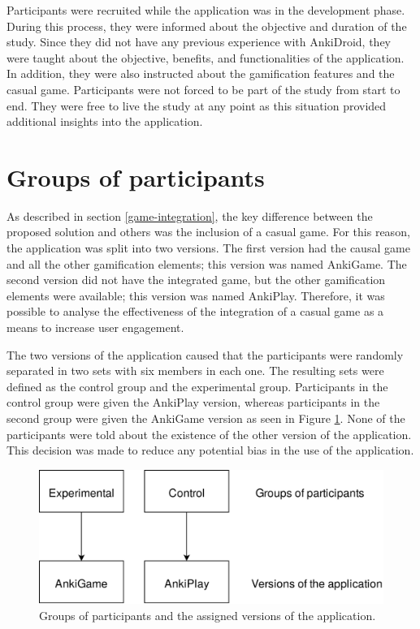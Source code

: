 Participants were recruited while the application was in the development phase. During this process, they were informed about the objective and duration of the study. Since they did not have any previous experience with AnkiDroid, they were taught about the objective, benefits, and functionalities of the application. In addition, they were also instructed about the gamification features and the casual game. Participants were not forced to be part of the study from start to end. They were free to live the study at any point as this situation provided additional insights into the application.

\section{Groups of participants}
As described in section \ref{game-integration}, the key difference between the proposed solution and others was the inclusion of a casual game. For this reason, the application was split into two versions. The first version had the causal game and all the other gamification elements; this version was named AnkiGame. The second version did not have the integrated game, but the other gamification elements were available; this version was named AnkiPlay. Therefore, it was possible to analyse the effectiveness of the integration of a casual game as a means to increase user engagement.

The two versions of the application caused that the participants were randomly separated in two sets with six members in each one. The resulting sets were defined as the control group and the experimental group. Participants in the control group were given the AnkiPlay version, whereas participants in the second group were given the AnkiGame version as seen in Figure \ref{fig:participants-version}. None of the participants were told about the existence of the other version of the application. This decision was made to reduce any potential bias in the use of the application.

\begin{figure}[htb]
    \vskip 5mm
        \begin{center}
            \includegraphics[scale=0.25]{./Figures/participants_version.png}
            \caption{Groups of participants and the assigned versions of the application.}
            \label{fig:participants-version}
        \end{center}
    \vskip -5mm
\end{figure}

